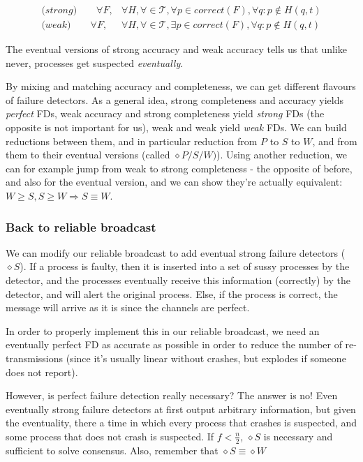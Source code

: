 \documentclass[a4paper,11pt,hidelinks]{article}
\begin{document}
\begin{align}
    \textit{(strong)}\quad\quad \forall F, & \forall H, \forall \in \mathcal{T}, \forall p \in correct(F), \forall q: p \notin H(q, t) \\
    \textit{(weak)}\quad\quad \forall F,   & \forall H, \forall \in \mathcal{T}, \exists p \in correct(F), \forall q: p \notin H(q, t)
\end{align}

The eventual versions of strong accuracy and weak accuracy tells us that unlike never, processes get suspected \textit{eventually}.

By mixing and matching accuracy and completeness, we can get different flavours of failure detectors. As a general idea, strong completeness and accuracy yields \textit{perfect} FDs, weak accuracy and strong completeness yield \textit{strong} FDs (the opposite is not important for us), weak and weak yield \textit{weak} FDs. We can build reductions between them, and in particular reduction from $P$ to $S$ to $W$, and from them to their eventual versions (called $\diamond P/S/W)$). Using another reduction, we can for example jump from weak to strong completeness - the opposite of before, and also for the eventual version, and we can show they're actually equivalent: $W \ge S, S \ge W \Rightarrow S \equiv W$.

\subsubsection{Back to reliable broadcast}

We can modify our reliable broadcast to add eventual strong failure detectors ($\diamond S$). If a process is faulty, then it is inserted into a set of sussy processes by the detector, and the processes eventually receive this information (correctly) by the detector, and will alert the original process. Else, if the process is correct, the message will arrive as it is since the channels are perfect.

In order to properly implement this in our reliable broadcast, we need an eventually perfect FD as accurate as possible in order to reduce the number of re-transmissions (since it's usually linear without crashes, but explodes if someone does not report).

However, is perfect failure detection really necessary? The answer is no! Even eventually strong failure detectors at first output arbitrary information, but given the eventuality, there a time in which every process that crashes is suspected, and some process that does not crash is suspected. If $f < \frac{n}{2}$, $\diamond S$ is necessary and sufficient to solve consensus. Also, remember that $\diamond S \equiv \diamond W$
\end{document}
